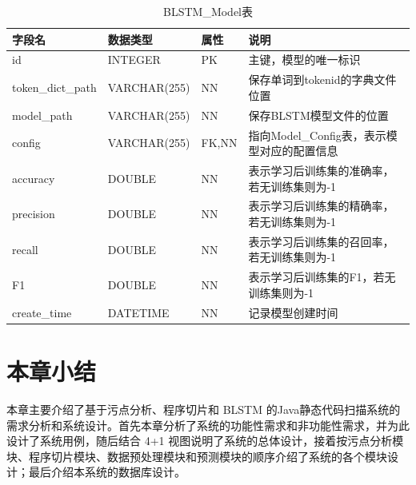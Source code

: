 \begin{table}[htb]\footnotesize %
	\centering
	\caption{BLSTM\_Model表}
	\vspace{2mm}
	\begin{tabular}{llll}
		\toprule
		\textbf{字段名}&\textbf{数据类型}&\textbf{属性}&\textbf{说明}\\
		\midrule
		id&INTEGER&PK&主键，模型的唯一标识\\
		token\_dict\_path &VARCHAR(255)&NN&保存单词到tokenid的字典文件位置\\
		model\_path		 &VARCHAR(255)&NN&保存BLSTM模型文件的位置\\
		config				 &VARCHAR(255)&FK,NN&指向Model\_Config表，表示模型对应的配置信息\\
		accuracy	&DOUBLE&NN&表示学习后训练集的准确率，若无训练集则为-1\\
		precision	&DOUBLE&NN&表示学习后训练集的精确率，若无训练集则为-1\\
		recall	&DOUBLE&NN&表示学习后训练集的召回率，若无训练集则为-1\\
		F1	&DOUBLE&NN&表示学习后训练集的F1，若无训练集则为-1\\
		create\_time		  &DATETIME&NN&记录模型创建时间\\
		\bottomrule
	\end{tabular}
	\label{sql:lstmModelTable}
\end{table}

\section{本章小结}

本章主要介绍了基于污点分析、程序切片和 BLSTM 的Java静态代码扫描系统的需求分析和系统设计。首先本章分析了系统的功能性需求和非功能性需求，并为此设计了系统用例，随后结合 4+1 视图说明了系统的总体设计，接着按污点分析模块、程序切片模块、数据预处理模块和预测模块的顺序介绍了系统的各个模块设计；最后介绍本系统的数据库设计。

